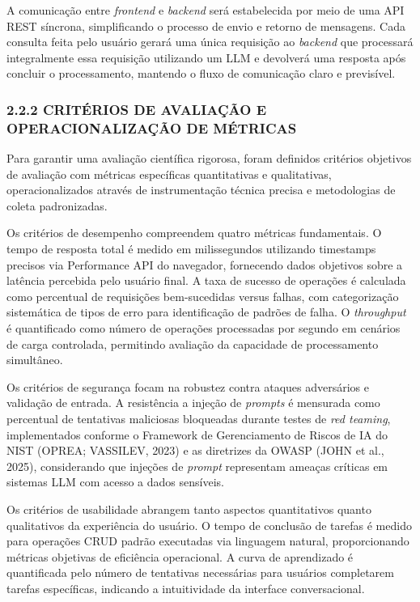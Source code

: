 \documentclass[
]{article}
\begin{document}
A comunicação entre \emph{frontend} e \emph{backend} será estabelecida
por meio de uma API REST síncrona, simplificando o processo de envio e
retorno de mensagens. Cada consulta feita pelo usuário gerará uma única
requisição ao \emph{backend} que processará integralmente essa
requisição utilizando um LLM e devolverá uma resposta após concluir o
processamento, mantendo o fluxo de comunicação claro e previsível.

\subsubsection{2.2.2 CRITÉRIOS DE AVALIAÇÃO E OPERACIONALIZAÇÃO DE
MÉTRICAS}\label{crituxe9rios-de-avaliauxe7uxe3o-e-operacionalizauxe7uxe3o-de-muxe9tricas}

Para garantir uma avaliação científica rigorosa, foram definidos
critérios objetivos de avaliação com métricas específicas quantitativas
e qualitativas, operacionalizados através de instrumentação técnica
precisa e metodologias de coleta padronizadas.

Os critérios de desempenho compreendem quatro métricas fundamentais. O
tempo de resposta total é medido em milissegundos utilizando timestamps
precisos via Performance API do navegador, fornecendo dados objetivos
sobre a latência percebida pelo usuário final. A taxa de sucesso de
operações é calculada como percentual de requisições bem-sucedidas
versus falhas, com categorização sistemática de tipos de erro para
identificação de padrões de falha. O \emph{throughput} é quantificado
como número de operações processadas por segundo em cenários de carga
controlada, permitindo avaliação da capacidade de processamento
simultâneo.

Os critérios de segurança focam na robustez contra ataques adversários e
validação de entrada. A resistência a injeção de \emph{prompts} é
mensurada como percentual de tentativas maliciosas bloqueadas durante
testes de \emph{red teaming}, implementados conforme o Framework de
Gerenciamento de Riscos de IA do NIST (OPREA; VASSILEV, 2023) e as
diretrizes da OWASP (JOHN et al., 2025), considerando que injeções de
\emph{prompt} representam ameaças críticas em sistemas LLM com acesso a
dados sensíveis.

Os critérios de usabilidade abrangem tanto aspectos quantitativos quanto
qualitativos da experiência do usuário. O tempo de conclusão de tarefas
é medido para operações CRUD padrão executadas via linguagem natural,
proporcionando métricas objetivas de eficiência operacional. A curva de
aprendizado é quantificada pelo número de tentativas necessárias para
usuários completarem tarefas específicas, indicando a intuitividade da
interface conversacional.
\end{document}
